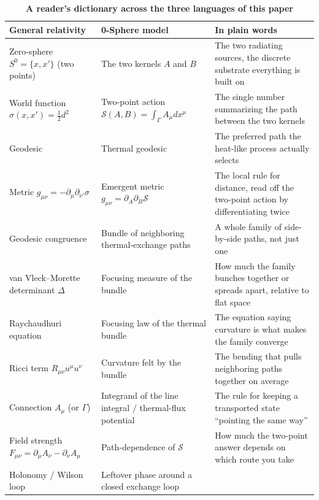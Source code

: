 \documentclass[%
 reprint, amsmath,amssymb, aps, prb, ]{revtex4-2}
\numberwithin{equation}{section}
\begin{document}
\begin{table}[t!]
\centering
\caption{\textbf{A reader's dictionary across the three languages of this paper}}
\label{tab:dictionary}
\renewcommand{\arraystretch}{1.35}
\begin{tabular}{p{4.6cm}p{5.2cm}p{6.0cm}}
\toprule
\textbf{General relativity} & \textbf{0-Sphere model} & \textbf{In plain words} \\
\midrule
Zero-sphere $S^0=\{x,x'\}$ (two points)
& The two kernels $A$ and $B$
& The two radiating sources, the discrete substrate everything is built on \\
\addlinespace[0.2cm]
World function $\sigma(x,x')=\tfrac12 d^2$
& Two-point action $\mathcal{S}(A,B)=\int_\Gamma A_\mu dx^\mu$
& The single number summarizing the path between the two kernels \\
\addlinespace[0.2cm]
Geodesic
& Thermal geodesic
& The preferred path the heat-like process actually selects \\
\addlinespace[0.2cm]
Metric $g_{\mu\nu}=-\partial_\mu\partial_{\nu'}\sigma$
& Emergent metric $g_{\mu\nu}=\partial_{A}\partial_{B}\mathcal{S}$
& The local rule for distance, read off the two-point action by differentiating twice \\
\addlinespace[0.2cm]
Geodesic congruence
& Bundle of neighboring thermal-exchange paths
& A whole family of side-by-side paths, not just one \\
\addlinespace[0.2cm]
van Vleck--Morette determinant $\Delta$
& Focusing measure of the bundle
& How much the family bunches together or spreads apart, relative to flat space \\
\addlinespace[0.2cm]
Raychaudhuri equation
& Focusing law of the thermal bundle
& The equation saying curvature is what makes the family converge \\
\addlinespace[0.2cm]
Ricci term $R_{\mu\nu}u^\mu u^\nu$
& Curvature felt by the bundle
& The bending that pulls neighboring paths together on average \\
\addlinespace[0.2cm]
Connection $A_\mu$ (or $\Gamma$)
& Integrand of the line integral / thermal-flux potential
& The rule for keeping a transported state ``pointing the same way'' \\
\addlinespace[0.2cm]
Field strength $F_{\mu\nu}=\partial_\mu A_\nu-\partial_\nu A_\mu$
& Path-dependence of $\mathcal{S}$
& How much the two-point answer depends on which route you take \\
\addlinespace[0.2cm]
Holonomy / Wilson loop
& Leftover phase around a closed exchange loop

\end{tabular}
\end{table}
\end{document}
